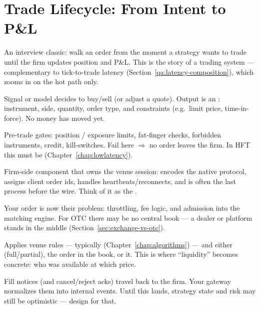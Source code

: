 \section{Trade Lifecycle: From Intent to P\&L}
\label{sec:trade-lifecycle}
An interview classic: walk an order from the moment a strategy wants to trade until 
the firm updates position and P\&L. This is the  
story of a trading system --- complementary to tick-to-trade latency 
(Section~\ref{qa:latency-composition}), which zooms in on the hot path only.

\begin{center}

\label{fig:trade-lifecycle}
\end{center}

Signal or model decides to buy/sell (or adjust a quote). Output is an 
: instrument, side, quantity, order type, and constraints 
(e.g.\ limit price, time-in-force). No money has moved yet.

Pre-trade gates: position / exposure limits, fat-finger checks, forbidden instruments, 
credit, kill-switches. Fail here $\Rightarrow$ no order leaves the firm. In HFT this 
must be  (Chapter~\ref{chap:lowlatency}).

Firm-side component that owns the venue session: encodes the native protocol, 
assigns client order ids, handles heartbeats/reconnects, and is often the last 
process before the wire. Think of it as the .

Your order is now their problem: throttling, fee logic, and admission into the 
matching engine. For OTC there may be no central book --- a dealer or platform 
stands in the middle (Section~\ref{sec:exchange-vs-otc}).

Applies venue rules --- typically  
(Chapter~\ref{chap:algorithms}) --- and either  (full/partial), 
 the order in the book, or  it. This is where 
``liquidity'' becomes concrete: who was available at which price.

Fill notices (and cancel/reject acks) travel back to the firm. Your gateway 
normalizes them into internal events. Until this lands, strategy state and risk 
may still be optimistic --- design for that.

